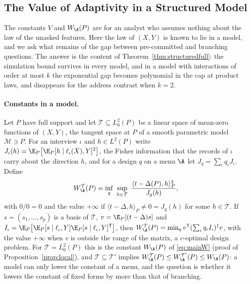\subsection{The Value of Adaptivity in a Structured Model}\label{app:structured}
The constants $V$ and $W_\A(P)$ are for an analyst who assumes nothing about
the law of the unasked features. Here the law of $(X,Y)$ is known to lie in a
model, and we ask what remains of the gap between pre-committed and branching
questions. The answer is the content of Theorem~\ref{thm:structuredfull}: the
simulation bound survives in every model, and in a model with interactions
of order at most $k$ the exponential gap becomes polynomial in the cap at
product laws, and disappears for the address contrast when $k=2$.

\paragraph{Constants in a model.}
Let $P$ have full support and let $\mathcal T\subseteq L^2_0(P)$ be a linear
space of mean-zero functions of $(X,Y)$, the tangent space at $P$ of a smooth
parametric model $\mathcal M\ni P$. For an interview $\iota$ and $h\in L^2(P)$
write $J_\iota(h)=\E_P\big[\E_P[h\mid\ell_\iota(X),Y]^2\big]$, the Fisher
information that the records of $\iota$ carry about the direction $h$, and
for a design $q$ on a menu $\A$ let $J_q=\sum_\iota q_\iota J_\iota$. Define
\begin{equation}
 W^{\mathcal T}_\A(P)=\inf_q\ \sup_{h\in\mathcal T}\ \frac{\langle t-\Delta(P),h\rangle_P^2}{J_q(h)},\label{eq:WT}
\end{equation}
with $0/0=0$ and the value $+\infty$ if $\langle t-\Delta,h\rangle_P\ne0=J_q(h)$
for some $h\in\mathcal T$. If $s=(s_1,\ldots,s_p)$ is a basis of
$\mathcal T$, $v=\E_P[(t-\Delta)s]$ and
$I_\iota=\E_P\big[\E_P[s\mid\ell_\iota,Y]\E_P[s\mid\ell_\iota,Y]^{\mathsf T}\big]$,
then $W^{\mathcal T}_\A(P)=\min_qv^{\mathsf T}(\sum_\iota q_\iota I_\iota)^\dagger v$,
with the value $+\infty$ when $v$ is outside the range of the matrix, a
$c$-optimal design problem. For $\mathcal T=L^2_0(P)$ this is the constant
$W_\A(P)$ of \eqref{eq:mainW} (proof of Proposition~\ref{prop:local}), and
$\mathcal T\subseteq\mathcal T'$ implies
$W^{\mathcal T}_\A(P)\le W^{\mathcal T'}_\A(P)\le W_\A(P)$: a model can only
lower the constant of a menu, and the question is whether it lowers the
constant of fixed forms by more than that of branching.

